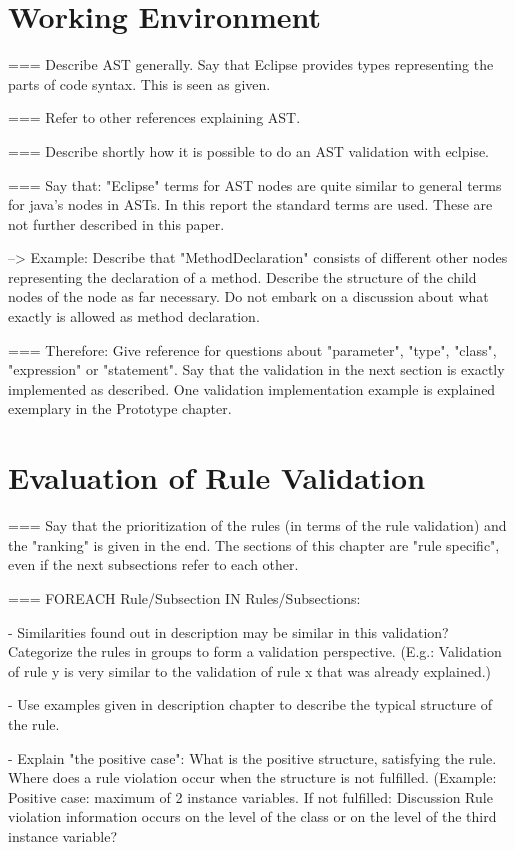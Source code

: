 \section{Working Environment}
=== Describe AST generally. Say that Eclipse provides types representing the parts of code syntax. This is seen as given. 

=== Refer to other references explaining AST.

=== Describe shortly how it is possible to do an AST validation with eclpise. 

=== Say that: "Eclipse" terms for AST nodes are quite similar to general terms for java's nodes in ASTs. In this report the standard terms are used. These are not further described in this paper.

--> Example: Describe that "MethodDeclaration" consists of different other nodes representing the declaration of a method. Describe the structure of the child nodes of the node as far necessary. Do not embark on a discussion about what exactly is allowed as method declaration. 

=== Therefore: Give reference for questions about "parameter", "type", "class", "expression" or "statement".
Say that the validation in the next section is exactly implemented as described. One validation implementation example is explained exemplary in the Prototype chapter.

\section{Evaluation of Rule Validation}
=== Say that the prioritization of the rules (in terms of the rule validation) and the "ranking" is given in the end. The sections of this chapter are "rule specific", even if the next subsections refer to each other.

=== FOREACH Rule/Subsection IN Rules/Subsections:

 - Similarities found out in description may be similar in this validation? Categorize the rules in groups to form a validation perspective. (E.g.: Validation of rule y is very similar to the validation of rule x that was already explained.)
  
 - Use examples given in description chapter to describe the typical structure of the rule. 
 
 - Explain "the positive case": What is the positive structure, satisfying the rule. Where does a rule violation occur when the structure is not fulfilled. (Example: Positive case: maximum of 2 instance variables. If not fulfilled: Discussion Rule violation information occurs on the level of the class or on the level of the third instance variable?
 
